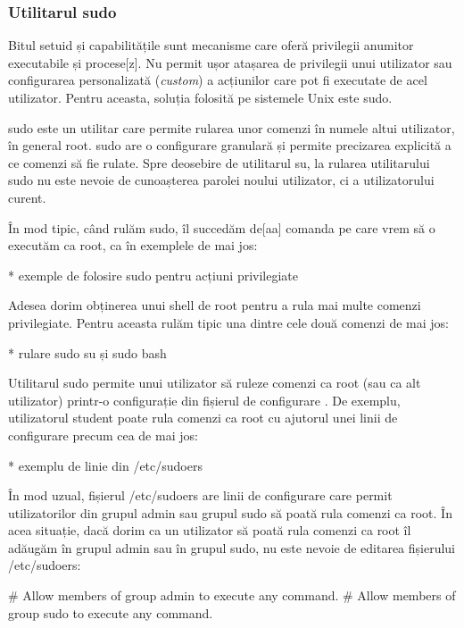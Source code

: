 \subsubsection{Utilitarul sudo}
\label{sec:users-superuser-altroot-sudo}

Bitul setuid și capabilitățile sunt mecanisme care oferă privilegii anumitor
executabile și procese[z]. Nu permit ușor atașarea de privilegii unui utilizator
sau configurarea personalizată (\textit{custom}) a acțiunilor care pot fi
executate de acel utilizator. Pentru aceasta, soluția folosită pe sistemele Unix
este sudo.

sudo este un utilitar care permite rularea unor comenzi în numele altui
utilizator, în general root. sudo are o configurare granulară și permite
precizarea explicită a ce comenzi să fie rulate. Spre deosebire de utilitarul
su, la rularea utilitarului sudo nu este nevoie de cunoașterea parolei noului
utilizator, ci a utilizatorului curent.

În mod tipic, când rulăm sudo, îl succedăm de[aa] comanda pe care vrem să o
executăm ca root, ca în exemplele de mai jos:

* exemple de folosire sudo pentru acțiuni privilegiate

Adesea dorim obținerea unui shell de root pentru a rula mai multe comenzi
privilegiate. Pentru aceasta rulăm tipic una dintre cele două comenzi de mai
jos:

* rulare sudo su și sudo bash

Utilitarul sudo permite unui utilizator să ruleze comenzi ca root (sau ca alt
utilizator) printr-o configurație din fișierul de configurare
. De exemplu, utilizatorul student poate rula comenzi ca root
cu ajutorul unei linii de configurare precum cea de mai jos:

* exemplu de linie din /etc/sudoers

În mod uzual, fișierul /etc/sudoers are linii de configurare care permit
utilizatorilor din grupul admin sau grupul sudo să poată rula comenzi ca root.
În acea situație, dacă dorim ca un utilizator să poată rula comenzi ca root îl
adăugăm în grupul admin sau în grupul sudo, nu este nevoie de editarea
fișierului /etc/sudoers:

\begin{screen}
# Allow members of group admin to execute any command.
# Allow members of group sudo to execute any command.
\end{screen}

